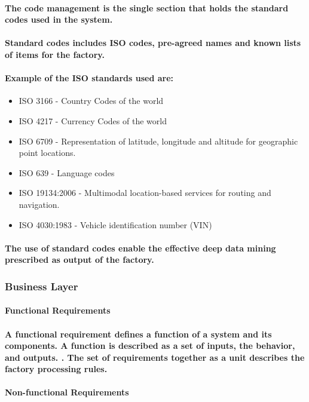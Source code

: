 \documentclass{acm_proc_article-sp}
\begin{document}
\paragraph{The code management is the single section that holds the standard codes used in the system.}
\paragraph{Standard codes includes ISO codes, pre-agreed names and known lists of items for the factory.}
\paragraph{Example of the ISO standards used are:}
\begin{itemize}
\item{ISO 3166 - Country Codes of the world}
\item{ISO 4217 - Currency Codes of the world}
\item{ISO 6709 - Representation of latitude, longitude and altitude for geographic point locations.}
\item{ISO 639 - Language codes}
\item{ISO 19134:2006 - Multimodal location-based services for routing and navigation.}
\item{ISO 4030:1983 - Vehicle identification number (VIN)}
\end{itemize}
\paragraph{The use of standard codes enable the effective deep data mining prescribed as output of the factory.}
\subsubsection{Business Layer}
\paragraph{Functional Requirements}
\paragraph{A functional requirement defines a function of a system and its components. A function is described as a set of inputs, the behavior, and outputs. \cite{roman1985taxonomy}. The set of requirements together as a unit describes the factory processing rules.}
\paragraph{Non-functional Requirements}
\end{document}
